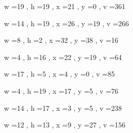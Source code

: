 \documentclass[11pt]{article}
\begin{document}
w =19 , h =19 , x =21 , y =0 , v =361
\par
w =14 , h =19 , x =26 , y =19 , v =266
\par
w =8 , h =2 , x =32 , y =38 , v =16
\par
w =4 , h =16 , x =22 , y =19 , v =64
\par
w =17 , h =5 , x =4 , y =0 , v =85
\par
w =4 , h =19 , x =17 , y =5 , v =76
\par
w =14 , h =17 , x =3 , y =5 , v =238
\par
w =12 , h =13 , x =9 , y =27 , v =156
\par
\newpage
\end{document}
